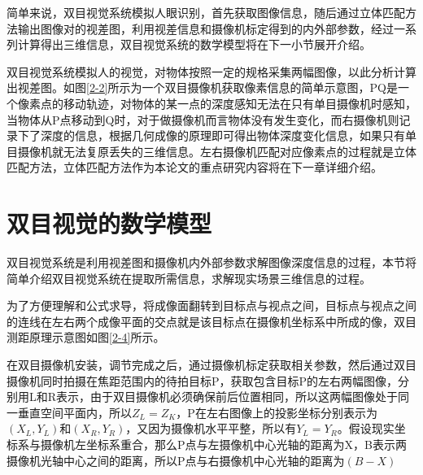 简单来说，双目视觉系统模拟人眼识别，首先获取图像信息，随后通过立体匹配方法输出图像对的视差图，利用视差信息和摄像机标定得到的内外部参数，经过一系列计算得出三维信息，双目视觉系统的数学模型将在下一小节展开介绍。

双目视觉系统模拟人的视觉，对物体按照一定的规格采集两幅图像，以此分析计算出视差图。如图\ref{2-2}所示为一个双目摄像机获取像素信息的简单示意图，PQ是一个像素点的移动轨迹，对物体的某一点的深度感知无法在只有单目摄像机时感知，当物体从P点移动到Q时，对于做摄像机而言物体没有发生变化，而右摄像机则记录下了深度的信息，根据几何成像的原理即可得出物体深度变化信息，如果只有单目摄像机就无法复原丢失的三维信息。左右摄像机匹配对应像素点的过程就是立体匹配方法，立体匹配方法作为本论文的重点研究内容将在下一章详细介绍。


\section{双目视觉的数学模型}

双目视觉系统是利用视差图和摄像机内外部参数求解图像深度信息的过程，本节将简单介绍双目视觉系统在提取所需信息，求解现实场景三维信息的过程。


为了方便理解和公式求导，将成像面翻转到目标点与视点之间，目标点与视点之间的连线在左右两个成像平面的交点就是该目标点在摄像机坐标系中所成的像，双目测距原理示意图如图\ref{2-4}所示。

在双目摄像机安装，调节完成之后，通过摄像机标定获取相关参数，然后通过双目摄像机同时拍摄在焦距范围内的待拍目标P，获取包含目标P的左右两幅图像，分别用L和R表示，由于双目摄像机必须确保前后位置相同，所以这两幅图像处于同一垂直空间平面内，所以$Z_{L}=Z_{K}$，P在左右图像上的投影坐标分别表示为$(X_{L},Y_{L})$和$(X_{R},Y_{R})$，又因为摄像机水平平整，所以有$Y_{L}=Y_{R}$。假设现实坐标系与摄像机左坐标系重合，那么P点与左摄像机中心光轴的距离为X，B表示两摄像机光轴中心之间的距离，所以P点与右摄像机中心光轴的距离为$(B-X)$

